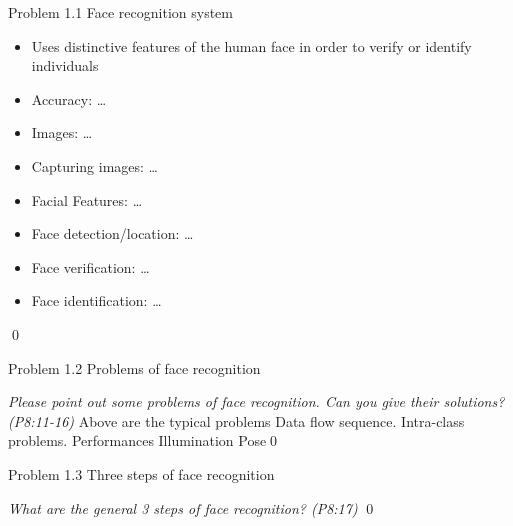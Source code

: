 \documentclass[
        ]{beamer}
\begin{document}
\begin{frame}[t]{Problem 1.1 Face recognition system}
\begin{overprint}
\begin{itemize}
\begin{itemize}
    					\item Uses distinctive features of the human face in order to verify or identify individuals
    					\item Accuracy: \ldots
							\item Images: \ldots
							\item Capturing images: \ldots
							\item Facial Features: \ldots
							\item Face detection/location: \ldots
							\item Face verification: \ldots
							\item Face identification: \ldots
    					\end{itemize}		
    				\end{itemize}			
    			
    			\qed		
    			\end{overprint}
    		\end{frame}
    
    		\begin{frame}[t]{Problem 1.2 Problems of face recognition}    		
    			\begin{overprint}
    			\emph{Please point out some problems of face recognition. Can you give their solutions? (P8:11-16)}
    			\onslide<2> 
    			Above are the typical problems
    			\onslide<3> 
    			Data flow sequence.
    			\onslide<4> 
    			Intra-class problems.
    			\onslide<5> 
    			Performances
    			\onslide<6> 
    			Illumination
    			\onslide<7> 
    			Pose\qed		
    			\end{overprint}
    		\end{frame}
    
    		\begin{frame}[t]{Problem 1.3 Three steps of face recognition}    		
    			\begin{overprint}
    			\onslide<1>
    			\emph{What are the general 3 steps of face recognition? (P8:17)}
    			\onslide<2> \inpdfc{8}{17} \qed		
    			\end{overprint}
    		\end{frame}
    
\end{document}
